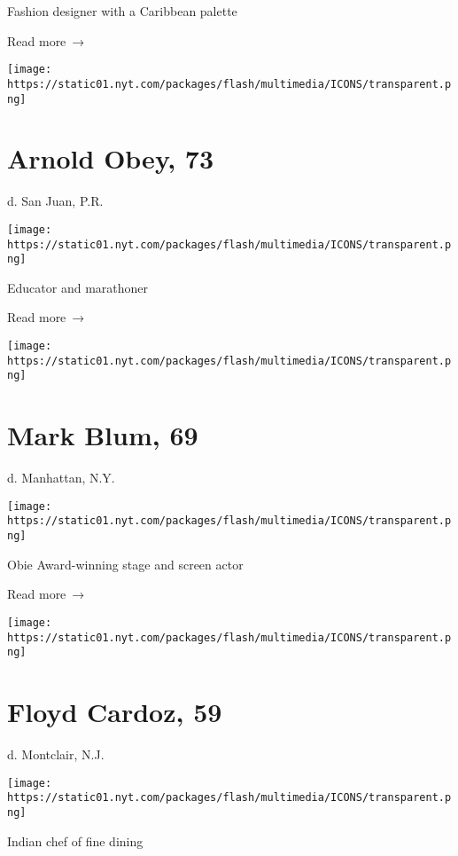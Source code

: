Fashion designer with a Caribbean palette

 Read more~→

\href{https://www.nytimes.com/2020/03/27/obituaries/arnold-obey-dead-coronavirus.html}{}

\texttt{[image: https://static01.nyt.com/packages/flash/multimedia/ICONS/transparent.png]}

\hypertarget{arnold-obey-73}{%
\section{Arnold Obey, 73}\label{arnold-obey-73}}

d. San Juan, P.R.

\texttt{[image: https://static01.nyt.com/packages/flash/multimedia/ICONS/transparent.png]}

Educator and marathoner

 Read more~→

\href{https://www.nytimes.com/2020/03/27/theater/mark-blum-dead-coronavirus.html}{}

\texttt{[image: https://static01.nyt.com/packages/flash/multimedia/ICONS/transparent.png]}

\hypertarget{mark-blum-69}{%
\section{Mark Blum, 69}\label{mark-blum-69}}

d. Manhattan, N.Y.

\texttt{[image: https://static01.nyt.com/packages/flash/multimedia/ICONS/transparent.png]}

Obie Award-winning stage and screen actor

 Read more~→

\href{https://www.nytimes.com/2020/03/25/dining/floyd-cardoz-dead-coronavirus.html}{}

\texttt{[image: https://static01.nyt.com/packages/flash/multimedia/ICONS/transparent.png]}

\hypertarget{floyd-cardoz-59}{%
\section{Floyd Cardoz, 59}\label{floyd-cardoz-59}}

d. Montclair, N.J.

\texttt{[image: https://static01.nyt.com/packages/flash/multimedia/ICONS/transparent.png]}

Indian chef of fine dining

